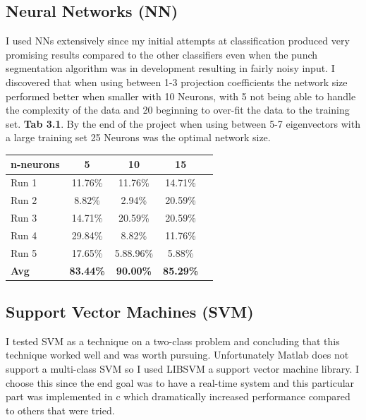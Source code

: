  \subsection{Neural Networks (NN)}
 I used NNs extensively since my initial attempts at classification produced very promising results compared to the other classifiers even when the punch segmentation algorithm was in development resulting in fairly noisy input. I discovered that when using between 1-3 projection coefficients the network size performed better when smaller with 10 Neurons, with 5 not being able to handle the complexity of the data and 20 beginning to over-fit the data to the training set. {\bf Tab 3.1}. By the end of the project when using between 5-7 eigenvectors with a large training set 25 Neurons was the optimal network size.
\begin{table}[h]
\begin{center}
    \begin{tabular}{ | l | c  | c | c | c |}
    \hline
    n-neurons & 5 & 10 & 15\\ \hline
    Run 1 & 11.76\% & 11.76\% & 14.71\%\\ \hline
    Run 2 & 8.82\% & 2.94\% & 20.59\%\\ \hline
    Run 3 & 14.71\% & 20.59\% & 20.59\%\\ \hline
    Run 4 & 29.84\% & 8.82\% & 11.76\%\\ \hline
    Run 5 & 17.65\% & 5.88.96\% & 5.88\%\\ \hline
    \textbf{Avg}   & \textbf{83.44\%} & \textbf{90.00\%} & \textbf{85.29\%}\\ \hline
    \end{tabular}
\end{center}
\end{table}

 \subsection{Support Vector Machines (SVM)}
I tested SVM as a technique on a two-class problem and concluding that this technique worked well and was worth pursuing. Unfortunately Matlab does not support a multi-class SVM so I used LIBSVM a support vector machine library. I choose this since the end goal was to have a real-time system and this particular part was implemented in c which dramatically increased performance compared to others that were tried. 

